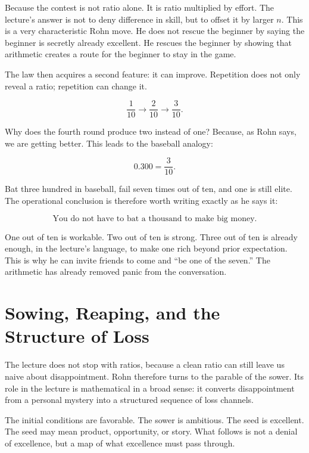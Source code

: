 Because the contest is not ratio alone. It is ratio multiplied by effort. The lecture's answer is not to deny difference in skill, but to offset it by larger \(n\). This is a very characteristic Rohn move. He does not rescue the beginner by saying the beginner is secretly already excellent. He rescues the beginner by showing that arithmetic creates a route for the beginner to stay in the game.

The law then acquires a second feature: it can improve. Repetition does not only reveal a ratio; repetition can change it.

\begin{equation}
\frac{1}{10} \longrightarrow \frac{2}{10} \longrightarrow \frac{3}{10}.
\end{equation}

Why does the fourth round produce two instead of one? Because, as Rohn says, we are getting better. This leads to the baseball analogy:

\begin{equation}
0.300 = \frac{3}{10}.
\end{equation}

Bat three hundred in baseball, fail seven times out of ten, and one is still elite. The operational conclusion is therefore worth writing exactly as he says it:

\begin{equation}
\text{You do not have to bat a thousand to make big money.}
\end{equation}

One out of ten is workable. Two out of ten is strong. Three out of ten is already enough, in the lecture's language, to make one rich beyond prior expectation. This is why he can invite friends to come and ``be one of the seven.'' The arithmetic has already removed panic from the conversation.

\section{Sowing, Reaping, and the Structure of Loss}

The lecture does not stop with ratios, because a clean ratio can still leave us naive about disappointment. Rohn therefore turns to the parable of the sower. Its role in the lecture is mathematical in a broad sense: it converts disappointment from a personal mystery into a structured sequence of loss channels.

The initial conditions are favorable. The sower is ambitious. The seed is excellent. The seed may mean product, opportunity, or story. What follows is not a denial of excellence, but a map of what excellence must pass through.

